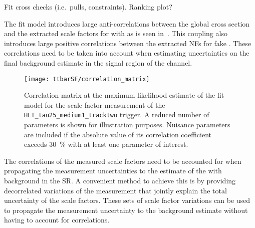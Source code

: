Fit cross checks (i.e.\ pulls, constraints). Ranking plot?

The fit model introduces large anti-correlations between the global
\ttbar cross section and the extracted scale factors for \ttbar with
\faketauhadvis as is seen
in~.  This coupling also introduces large positive correlations
between the extracted NFs for fake \tauhadvis. These correlations need
to be taken into account when estimating uncertainties on the final
background estimate in the signal region of the \hadhad channel.

\begin{figure}[htbp]
  \centering
  \texttt{[image: ttbarSF/correlation\_matrix]}

  \caption{Correlation matrix at the maximum likelihood estimate of
    the fit model for the scale factor measurement of the
    \texttt{HLT\_tau25\_medium1\_tracktwo} trigger. A reduced number
    of parameters is shown for illustration purposes. Nuisance
    parameters are included if the absolute value of its correlation
    coefficient exceeds \SI{30}{\percent} with at least one parameter
    of interest.}
  \label{fig:ttbarSF_corr_matrix}
\end{figure}

The correlations of the measured scale factors need to be accounted
for when propagating the measurement uncertainties to the estimate of
the \ttbar with \faketauhadvis background in the \hadhad SR. A
convenient method to achieve this is by providing decorrelated
variations of the measurement that jointly explain the total
uncertainty of the scale factors. These sets of scale factor
variations can be used to propagate the measurement uncertainty to the
background estimate without having to account for correlations.

